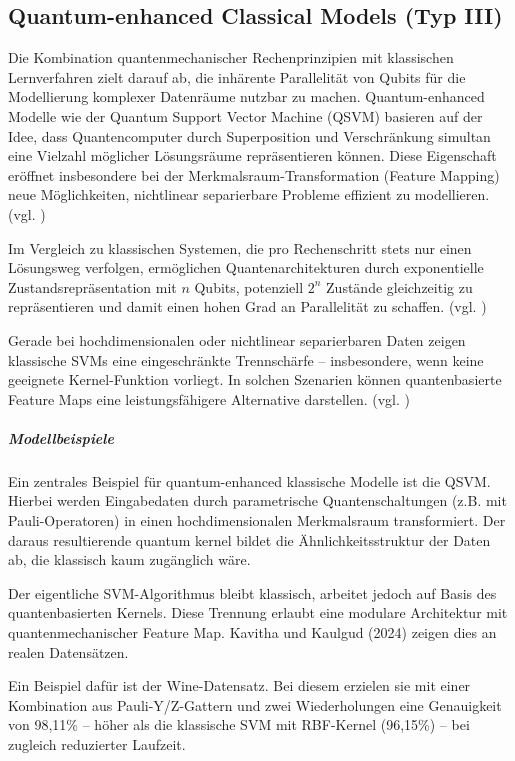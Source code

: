 \vspace{1.5em}
\subsection{Quantum-enhanced Classical Models (Typ III)}
Die Kombination quantenmechanischer Rechenprinzipien mit klassischen Lernverfahren zielt darauf ab, die inhärente Parallelität von Qubits für die Modellierung komplexer Datenräume nutzbar zu machen. Quantum-enhanced Modelle wie der Quantum Support Vector Machine (QSVM) basieren auf der Idee, dass Quantencomputer durch Superposition und Verschränkung simultan eine Vielzahl möglicher Lösungsräume repräsentieren können. Diese Eigenschaft eröffnet insbesondere bei der Merkmalsraum-Transformation (Feature Mapping) neue Möglichkeiten, nichtlinear separierbare Probleme effizient zu modellieren. (vgl. \cite{kavithaQuantumMachineLearning2024})

Im Vergleich zu klassischen Systemen, die pro Rechenschritt stets nur einen Lösungsweg verfolgen, ermöglichen Quantenarchitekturen durch exponentielle Zustandsrepräsentation mit \( n \) Qubits, potenziell \( 2^n \) Zustände gleichzeitig zu repräsentieren und damit einen hohen Grad an Parallelität zu schaffen. (vgl. \cite{gujjuQuantumMachineLearning2024})

Gerade bei hochdimensionalen oder nichtlinear separierbaren Daten zeigen klassische SVMs eine eingeschränkte Trennschärfe – insbesondere, wenn keine geeignete Kernel-Funktion vorliegt. In solchen Szenarien können quantenbasierte Feature Maps eine leistungsfähigere Alternative 
darstellen. (vgl. \cite{peral-garciaSystematicLiteratureReview2024})

\subparagraph{Modellbeispiele}
Ein zentrales Beispiel für quantum-enhanced klassische Modelle ist die QSVM. Hierbei werden Eingabedaten durch parametrische Quantenschaltungen (z.B. mit Pauli-Operatoren) in einen hochdimensionalen Merkmalsraum transformiert. Der daraus resultierende quantum kernel bildet die Ähnlichkeitsstruktur der Daten ab, die klassisch kaum zugänglich wäre. 


Der eigentliche SVM-Algorithmus bleibt klassisch, arbeitet jedoch auf Basis des quantenbasierten Kernels. Diese Trennung erlaubt eine modulare Architektur mit quantenmechanischer Feature Map.
Kavitha und Kaulgud (2024) zeigen dies an realen Datensätzen.

Ein Beispiel dafür ist der Wine-Datensatz. Bei diesem erzielen sie mit einer Kombination aus Pauli-Y/Z-Gattern und zwei Wiederholungen eine Genauigkeit von 98{,}11\% – höher als die klassische SVM mit RBF-Kernel (96{,}15\%) – bei zugleich reduzierter Laufzeit.

